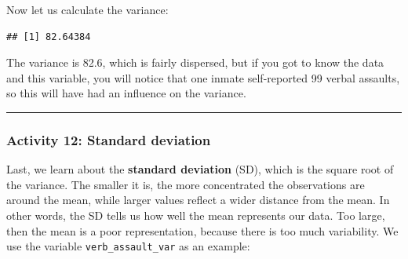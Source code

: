 \documentclass[
]{book}
\newenvironment{Shaded}{\begin{snugshade}}{\end{snugshade}}
\newcommand{\AttributeTok}[1]{\textcolor[rgb]{0.77,0.63,0.00}{#1}}
\newcommand{\CommentTok}[1]{\textcolor[rgb]{0.56,0.35,0.01}{\textit{#1}}}
\newcommand{\ConstantTok}[1]{\textcolor[rgb]{0.00,0.00,0.00}{#1}}
\newcommand{\FunctionTok}[1]{\textcolor[rgb]{0.00,0.00,0.00}{#1}}
\newcommand{\NormalTok}[1]{#1}
\newcommand{\OtherTok}[1]{\textcolor[rgb]{0.56,0.35,0.01}{#1}}
\newcommand{\SpecialCharTok}[1]{\textcolor[rgb]{0.00,0.00,0.00}{#1}}
\begin{document}
Now let us calculate the variance:

\begin{Shaded}
\end{Shaded}

\begin{verbatim}
## [1] 82.64384
\end{verbatim}

The variance is 82.6, which is fairly dispersed, but if you got to know the data and this variable, you will notice that one inmate self-reported 99 verbal assaults, so this will have had an influence on the variance.

\begin{center}\rule{0.5\linewidth}{0.5pt}\end{center}

\hypertarget{activity-12-standard-deviation}{%
\subsubsection{Activity 12: Standard deviation}\label{activity-12-standard-deviation}}

Last, we learn about the \textbf{standard deviation} (SD), which is the square root of the variance. The smaller it is, the more concentrated the observations are around the mean, while larger values reflect a wider distance from the mean. In other words, the SD tells us how well the mean represents our data. Too large, then the mean is a poor representation, because there is too much variability. We use the variable \texttt{verb\_assault\_var} as an example:

\begin{Shaded}
\end{Shaded}
\end{document}
